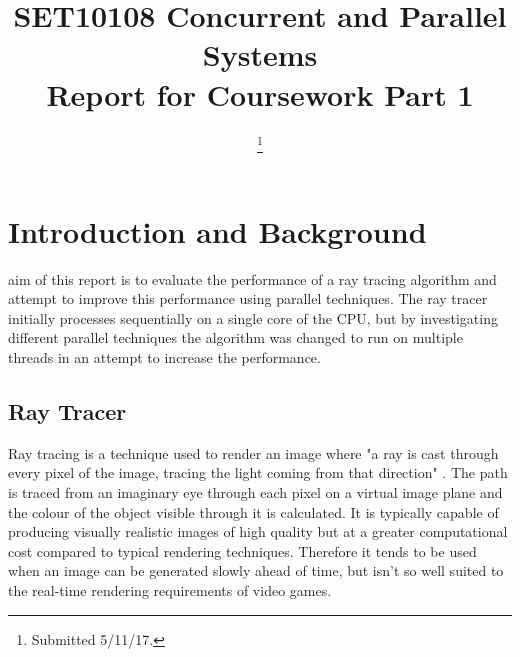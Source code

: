 \documentclass[journal,transmag]{IEEEtran}
\begin{document}
	
	\title{SET10108 Concurrent and Parallel Systems\\Report for Coursework Part 1}
	
	\author{
		
		\thanks{Submitted 5/11/17.}}
	
	
	
	
	\maketitle
	
	\IEEEdisplaynontitleabstractindextext
	
	\IEEEpeerreviewmaketitle
	
	\section{Introduction and Background}
	 aim of this report is to evaluate the performance of a ray tracing algorithm and attempt to improve this performance using parallel techniques. The ray tracer initially processes sequentially on a single core of the CPU, but by investigating different parallel techniques the algorithm was changed to run on multiple threads in an attempt to increase the performance.
	
	\subsection{Ray Tracer}
	Ray tracing is a technique used to render an image where "a ray is cast through every pixel of the image, tracing the light coming from that direction" \cite{ray}. The path is traced from an imaginary eye through each pixel on a virtual image plane and the colour of the object visible through it is calculated. It is typically capable of producing visually realistic images of high quality but at a greater computational cost compared to typical rendering techniques. Therefore it tends to be used when an image can be generated slowly ahead of time, but isn't so well suited to the real-time rendering requirements of video games.
	
\end{document}
